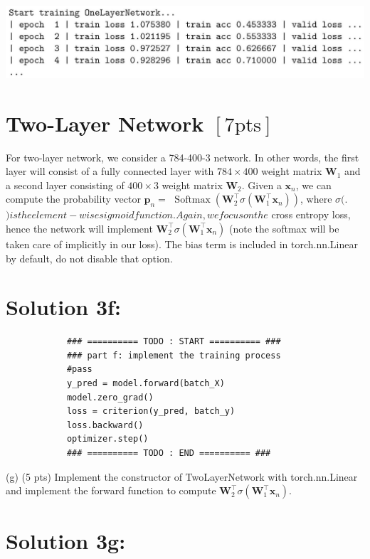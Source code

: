 \documentclass[10pt]{article}
\begin{document}
\begin{center}
\includegraphics[max width=\textwidth]{2024_02_27_2131df32af4f1644e3f0g-3}
\end{center}

\section*{Two-Layer Network $[7 \mathrm{pts}]$}
For two-layer network, we consider a 784-400-3 network. In other words, the first layer will consist of a fully connected layer with $784 \times 400$ weight matrix $\mathbf{W}_{1}$ and a second layer consisting of $400 \times 3$ weight matrix $\mathbf{W}_{2}$. Given a $\mathbf{x}_{n}$, we can compute the probability vector $\mathbf{p}_{n}=$ $\operatorname{Softmax}\left(\mathbf{W}_{2}^{\top} \sigma\left(\mathbf{W}_{1}^{\top} \mathbf{x}_{n}\right)\right)$, where $\sigma($.$) is the element-wise sigmoid function. Again, we focus on the$ cross entropy loss, hence the network will implement $\mathbf{W}_{2}^{\top} \sigma\left(\mathbf{W}_{1}^{\top} \mathbf{x}_{n}\right)$ (note the softmax will be taken care of implicitly in our loss). The bias term is included in torch.nn.Linear by default, do not disable that option.

\section*{Solution 3f:}

\begin{verbatim}
            ### ========== TODO : START ========== ###
            ### part f: implement the training process
            #pass
            y_pred = model.forward(batch_X)
            model.zero_grad()
            loss = criterion(y_pred, batch_y)
            loss.backward()
            optimizer.step()
            ### ========== TODO : END ========== ###
\end{verbatim}

(g) (5 pts) Implement the constructor of TwoLayerNetwork with torch.nn.Linear and implement the forward function to compute $\mathbf{W}_{2}^{\top} \sigma\left(\mathbf{W}_{1}^{\top} \mathbf{x}_{n}\right)$.

\section*{Solution 3g:}
\end{document}
